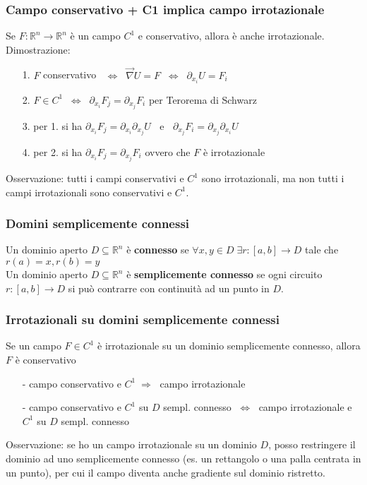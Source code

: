 \documentclass[a4paper]{article}
\newcommand\Rn{\mathbb{R}^n}  %
\newcommand\nab{\vec{\nabla}} %
\begin{document}
\subsubsection*{Campo conservativo + C1 implica campo irrotazionale}
Se \(F: \Rn \to \Rn\) è un campo \(C^1\) e conservativo, allora è anche irrotazionale. \\
Dimostrazione:
\begin{itemize}[topsep=3pt, itemsep=0pt]
	\item[1.] \(F\) conservativo \(\;\; \Leftrightarrow \;\; \nab U = F \;\; \Leftrightarrow \;\; \partial_{x_i}U = F_i\)
	\item[2.] \(F \in C^1 \;\; \Leftrightarrow \;\; \partial_{x_i} F_j = \partial_{x_j} F_i\) per Terorema di Schwarz
	\item[3.] per 1. si ha \(\partial_{x_i} F_j = \partial_{x_i} \partial_{x_j} U \;\;\) e \(\;\;\partial_{x_j} F_i = \partial_{x_j} \partial_{x_i} U\)
	\item[4.] per 2. si ha \(\partial_{x_i} F_j = \partial_{x_j} F_i\) ovvero che \(F\) è irrotazionale
\end{itemize}
Osservazione: tutti i campi conservativi e \(C^1\) sono irrotazionali, ma non tutti i campi irrotazionali sono conservativi e \(C^1\).

\subsubsection*{Domini semplicemente connessi}
Un dominio aperto \(D \subseteq \Rn\) è \textbf{connesso} se \(\forall x,y \in D \; \exists r:[a,b] \to D\) tale che \(r(a) = x, r(b) = y\) \\
Un dominio aperto \(D \subseteq \Rn\) è \textbf{semplicemente connesso} se ogni circuito \(r:[a,b] \to D\) si può contrarre con continuità
ad un punto in \(D\).

\subsubsection*{Irrotazionali su domini semplicemente connessi}
Se un campo \(F \in C^1\) è irrotazionale su un dominio semplicemente connesso, allora \(F\) è conservativo
\begin{itemize}[topsep=3pt, itemsep=0pt]
	\item[-] campo conservativo e \(C^1 \; \Rightarrow \;\) campo irrotazionale
	\item[-] campo conservativo e \(C^1\) su \(D\) sempl. connesso \(\; \Leftrightarrow \;\) campo irrotazionale e \(C^1\) su \(D\) sempl. connesso
\end{itemize}
Osservazione: se ho un campo irrotazionale su un dominio \(D\), posso restringere il dominio ad uno semplicemente connesso (es.
un rettangolo o una palla centrata in un punto), per cui il campo diventa anche gradiente sul dominio ristretto.
\end{document}

